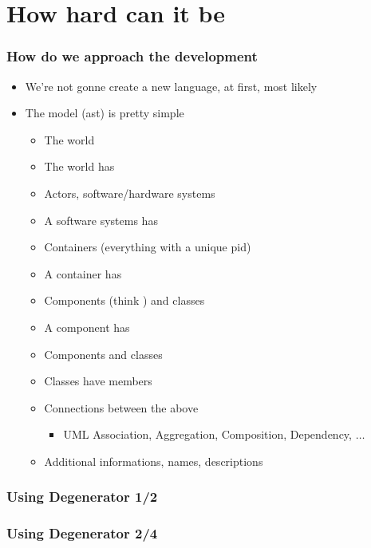 \documentclass[xelatex,10pt]{beamer}
\begin{document}
\section{How hard can it be}
\begin{frame}
	\frametitle{How do we approach the development}
	\begin{itemize}
		\item We're not gonne create a new language\pause, at first\pause,
			most likely
			\pause
		\item The model (ast) is pretty simple
			\pause
		\begin{itemize}
			\item The world
			\item The world has
			\item Actors, software/hardware systems
			\item A software systems has
			\item Containers (everything with a unique pid)
			\item A container has
			\item Components (think \lstinline@module@) and classes
			\item A component has
			\item Components and classes
			\item Classes have members
				\pause
			\item Connections between the above
			\begin{itemize}
				\item UML Association, Aggregation, Composition, Dependency, \(\dots\)
			\end{itemize}
			\item Additional informations, names, descriptions
		\end{itemize}
	\end{itemize}
\end{frame}

\begin{frame}
	\frametitle{Using Degenerator 1/2}
	
	\pause
	
\end{frame}
\begin{frame}
	\frametitle{Using Degenerator 2/4}
	
	\pause
	
\end{frame}
\end{document}
